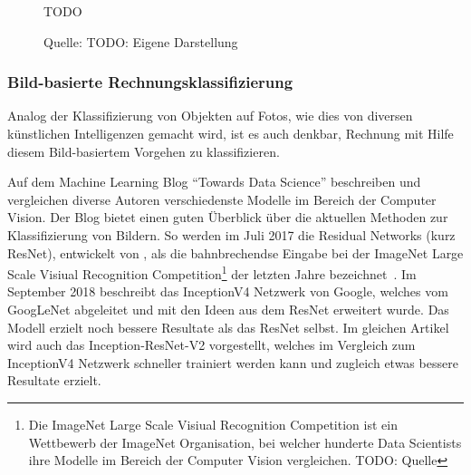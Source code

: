 \begin{figure}[h]
    \captionsetup{width=.8\linewidth}
    \caption{TODO}
    \label{class-distribution}
    \centering
    \caption*{Quelle: TODO: Eigene Darstellung}
\end{figure}

\subsubsection{Bild-basierte Rechnungsklassifizierung}


Analog der Klassifizierung von Objekten auf Fotos, wie dies von diversen künstlichen Intelligenzen gemacht wird, ist es auch denkbar, Rechnung mit Hilfe diesem Bild-basiertem Vorgehen zu klassifizieren.

Auf dem Machine Learning Blog \enquote{Towards Data Science} beschreiben und vergleichen diverse Autoren verschiedenste Modelle im Bereich der Computer Vision. Der Blog bietet einen guten Überblick über die aktuellen Methoden zur Klassifizierung von Bildern. So werden im Juli 2017 die Residual Networks (kurz ResNet), entwickelt von \textcite{He2015}, als die bahnbrechendse Eingabe bei der ImageNet Large Scale Visiual Recognition Competition\footnote{Die ImageNet Large Scale Visiual Recognition Competition ist ein Wettbewerb der ImageNet Organisation, bei welcher hunderte Data Scientists ihre Modelle im Bereich der Computer Vision vergleichen. TODO: Quelle} der letzten Jahre bezeichnet~\autocite{Fungg2017ResNet}. Im September 2018 beschreibt \textcite{SHTsuang2018Inception} das InceptionV4 Netzwerk von Google, welches vom GoogLeNet abgeleitet und mit den Ideen aus dem ResNet erweitert wurde. Das Modell erzielt noch bessere Resultate als das ResNet selbst. Im gleichen Artikel wird auch das Inception-ResNet-V2 vorgestellt, welches im Vergleich zum InceptionV4 Netzwerk schneller trainiert werden kann und zugleich etwas bessere Resultate erzielt. 

